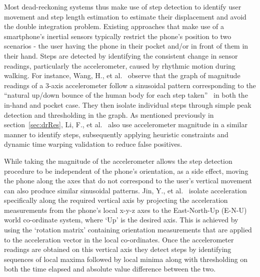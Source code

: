 \documentclass[12pt,a4paper]{report}
\begin{document}
Most dead-reckoning systems thus make use of step detection to identify user movement and step length estimation to estimate their displacement and avoid the double integration problem. Existing approaches that make use of a smartphone’s inertial sensors typically restrict the phone’s position to two scenarios - the user having the phone in their pocket and/or in front of them in their hand. Steps are detected by identifying the consistent change in sensor readings, particularly the accelerometer, caused by rhythmic motion during walking. For instance, Wang, H., et al.~\cite{wang2012no} observe that the graph of magnitude readings of a 3-axis accelerometer follow a sinusoidal pattern corresponding to the ``natural up/down bounce of the human body for each step taken''~\cite[p.203]{wang2012no} in both the in-hand and pocket case. They then isolate individual steps through simple peak detection and thresholding in the graph. As mentioned previously in section~\ref{sec:drRes}, Li, F., et al.~\cite{li2012reliable} also use accelerometer magnitude in a similar manner to identify steps, subsequently applying heuristic constraints and dynamic time warping validation to reduce false positives.  

While taking the magnitude of the accelerometer allows the step detection procedure to be independent of the phone’s orientation, as a side effect, moving the phone along the axes that do not correspond to the user’s vertical movement can also produce similar sinusoidal patterns. Jin, Y., et al.~\cite{jin2011robust} isolate acceleration specifically along the required vertical axis by projecting the acceleration measurements from the phone’s local x-y-z axes to the East-North-Up (E-N-U) world co-ordinate system, where `Up' is the desired axis.  This is achieved by using the `rotation matrix' containing orientation measurements that are applied to the acceleration vector in the local co-ordinates. Once the accelerometer readings are obtained on this vertical axis they detect steps by identifying sequences of local maxima followed by local minima along with thresholding on both the time elapsed and absolute value difference between the two. 
\end{document}

